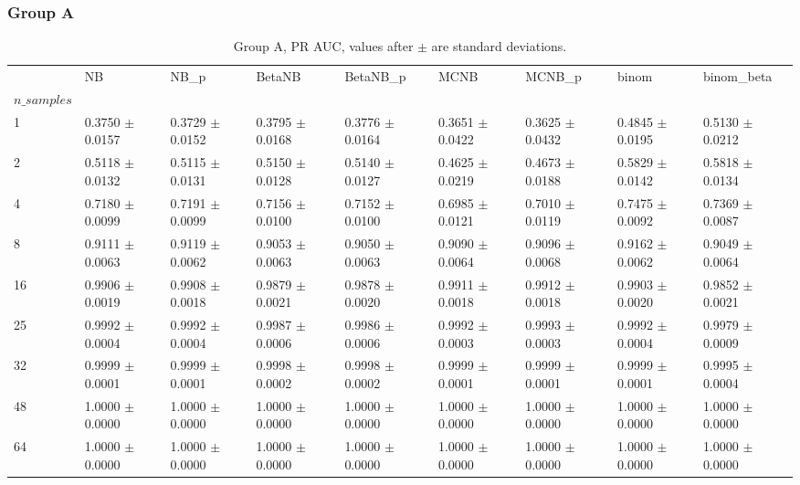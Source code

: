 \subsubsection*{Group A}
\begin{table}[H]
\centering
\begin{adjustbox}{max width=\linewidth}
\begin{tabular}{lllllllll}
\toprule
 & NB & NB\_p & BetaNB & BetaNB\_p & MCNB & MCNB\_p & binom & binom\_beta \\
$n\_samples$ &  &  &  &  &  &  &  &  \\
\midrule
1 & 0.3750 $\pm$ 0.0157 & 0.3729 $\pm$ 0.0152 & 0.3795 $\pm$ 0.0168 & 0.3776 $\pm$ 0.0164 & 0.3651 $\pm$ 0.0422 & 0.3625 $\pm$ 0.0432 & 0.4845 $\pm$ 0.0195 & 0.5130 $\pm$ 0.0212 \\
2 & 0.5118 $\pm$ 0.0132 & 0.5115 $\pm$ 0.0131 & 0.5150 $\pm$ 0.0128 & 0.5140 $\pm$ 0.0127 & 0.4625 $\pm$ 0.0219 & 0.4673 $\pm$ 0.0188 & 0.5829 $\pm$ 0.0142 & 0.5818 $\pm$ 0.0134 \\
4 & 0.7180 $\pm$ 0.0099 & 0.7191 $\pm$ 0.0099 & 0.7156 $\pm$ 0.0100 & 0.7152 $\pm$ 0.0100 & 0.6985 $\pm$ 0.0121 & 0.7010 $\pm$ 0.0119 & 0.7475 $\pm$ 0.0092 & 0.7369 $\pm$ 0.0087 \\
8 & 0.9111 $\pm$ 0.0063 & 0.9119 $\pm$ 0.0062 & 0.9053 $\pm$ 0.0063 & 0.9050 $\pm$ 0.0063 & 0.9090 $\pm$ 0.0064 & 0.9096 $\pm$ 0.0068 & 0.9162 $\pm$ 0.0062 & 0.9049 $\pm$ 0.0064 \\
16 & 0.9906 $\pm$ 0.0019 & 0.9908 $\pm$ 0.0018 & 0.9879 $\pm$ 0.0021 & 0.9878 $\pm$ 0.0020 & 0.9911 $\pm$ 0.0018 & 0.9912 $\pm$ 0.0018 & 0.9903 $\pm$ 0.0020 & 0.9852 $\pm$ 0.0021 \\
25 & 0.9992 $\pm$ 0.0004 & 0.9992 $\pm$ 0.0004 & 0.9987 $\pm$ 0.0006 & 0.9986 $\pm$ 0.0006 & 0.9992 $\pm$ 0.0003 & 0.9993 $\pm$ 0.0003 & 0.9992 $\pm$ 0.0004 & 0.9979 $\pm$ 0.0009 \\
32 & 0.9999 $\pm$ 0.0001 & 0.9999 $\pm$ 0.0001 & 0.9998 $\pm$ 0.0002 & 0.9998 $\pm$ 0.0002 & 0.9999 $\pm$ 0.0001 & 0.9999 $\pm$ 0.0001 & 0.9999 $\pm$ 0.0001 & 0.9995 $\pm$ 0.0004 \\
48 & 1.0000 $\pm$ 0.0000 & 1.0000 $\pm$ 0.0000 & 1.0000 $\pm$ 0.0000 & 1.0000 $\pm$ 0.0000 & 1.0000 $\pm$ 0.0000 & 1.0000 $\pm$ 0.0000 & 1.0000 $\pm$ 0.0000 & 1.0000 $\pm$ 0.0000 \\
64 & 1.0000 $\pm$ 0.0000 & 1.0000 $\pm$ 0.0000 & 1.0000 $\pm$ 0.0000 & 1.0000 $\pm$ 0.0000 & 1.0000 $\pm$ 0.0000 & 1.0000 $\pm$ 0.0000 & 1.0000 $\pm$ 0.0000 & 1.0000 $\pm$ 0.0000 \\
\bottomrule
\end{tabular}

\end{adjustbox}
\caption{Group A, PR AUC, values after $\pm$ are standard deviations.}
\end{table}

